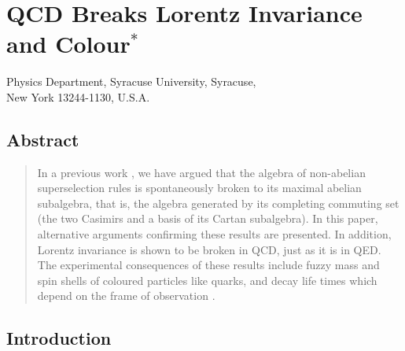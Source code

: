 \chapter[QCD Breaks Lorentz Invariance and Colour]{QCD Breaks Lorentz Invariance and Colour$^{*}$}\label{chap1}



\begin{center}
Physics Department, Syracuse University, Syracuse,\\ 
New York 13244-1130, U.S.A.
\end{center}


\section*{Abstract}

\begin{quote}
In a previous work \cite{key1}, we have argued that the algebra of non-abelian superselection rules is spontaneously broken to its maximal abelian subalgebra, that is, the algebra generated by its completing commuting set (the two Casimirs and a basis of its Cartan subalgebra). In this paper, alternative arguments confirming these results are presented. In addition, Lorentz invariance is shown to be broken in QCD, just as it is in QED. The experimental consequences of these results include fuzzy mass and spin shells of coloured particles like quarks, and decay life times which depend on the frame of observation \cite{key2,key3,key4}.
\end{quote}

\section{Introduction}\label{chap1-sec1}

